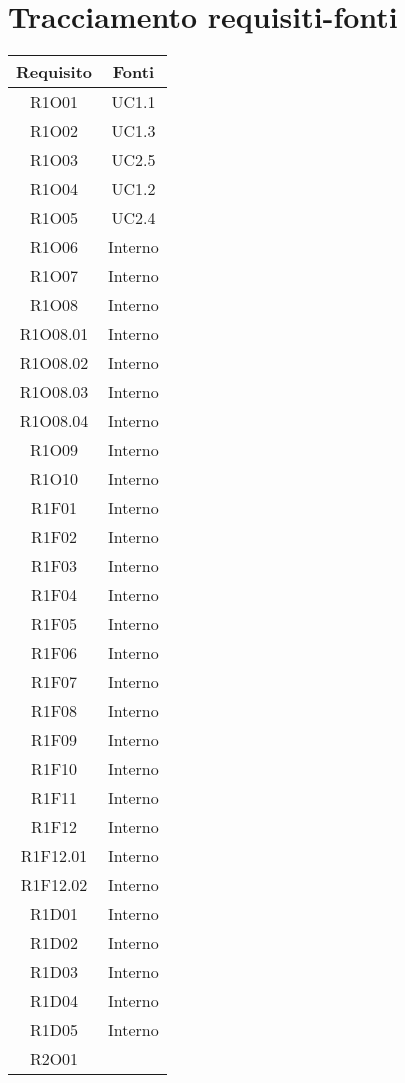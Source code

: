 \section{Tracciamento requisiti-fonti}
\begin{tabularx}{\textwidth}{|C|C|}
	\hline
	\textbf{Requisito} & \textbf{Fonti} \\
	\hline
	\endhead
	R1O01& UC1.1\\
	\hline
	R1O02& UC1.3\\
	\hline
	R1O03& UC2.5\\
	\hline
	R1O04& UC1.2\\
	\hline
	R1O05& UC2.4\\
	\hline
	R1O06& Interno\\
	\hline
	R1O07& Interno\\
	\hline	
	R1O08& Interno\\
	\hline
	R1O08.01& Interno\\
	\hline	
	R1O08.02& Interno\\
	\hline		
	R1O08.03& Interno\\
	\hline		
	R1O08.04& Interno\\
	\hline	
	R1O09& Interno\\
	\hline	
	R1O10& Interno\\
	\hline
	R1F01& Interno\\
	\hline
	R1F02& Interno\\
	\hline
	R1F03& Interno\\
	\hline
	R1F04& Interno\\
	\hline
	R1F05& Interno\\
	\hline
	R1F06& Interno\\
	\hline
	R1F07& Interno\\
	\hline
	R1F08& Interno\\
	\hline
	R1F09& Interno\\
	\hline
	R1F10& Interno\\
	\hline
	R1F11& Interno\\
	\hline
	R1F12& Interno\\
	\hline
	R1F12.01& Interno\\
	\hline
	R1F12.02& Interno\\
	\hline
	R1D01& Interno\\
	\hline
	R1D02& Interno\\
	\hline
	R1D03& Interno\\
	\hline
	R1D04& Interno\\
	\hline
	R1D05& Interno\\
	\hline
	R2O01&\\

\end{tabularx}
